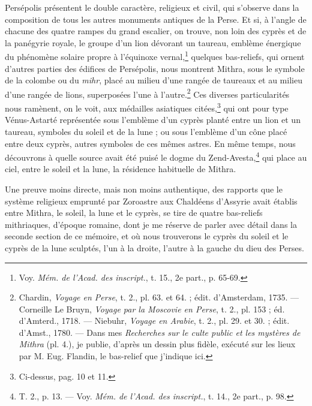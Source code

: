\documentclass[a4paper, 11pt, oneside, polutonikogreek, french]{article}
\begin{document}
Persépolis présentent le double caractère, religieux et civil, qui s'observe dans la composition de tous les autres monuments antiques de la Perse. Et si, à l'angle de chacune des quatre rampes du grand escalier, on trouve, non loin des cyprès et de la panégyrie royale, le groupe d'un lion dévorant un taureau, emblème énergique du phénomène solaire propre à l'équinoxe vernal,\footnote{Voy. \emph{Mém. de l'Acad. des inscript.}, t. 15., 2e part., p. 65-69.} quelques bas-reliefs, qui ornent d'autres parties des édifices de Persépolis, nous montrent Mithra, sous le symbole de la colombe ou du \emph{mihr}, placé au milieu d'une rangée de taureaux et au milieu d'une rangée de lions, superposées l'une à l'autre.\footnote{Chardin, \emph{Voyage en Perse}, t. 2., pl. 63. et 64. ; édit. d'Amsterdam, 1735. --- Corneille Le Bruyn, \emph{Voyage par la Moscovie en Perse}, t. 2., pl. 153 ; éd. d'Amterd., 1718. --- Niebuhr, \emph{Voyage en Arabie}, t. 2., pl. 29. et 30. ; édit. d'Amst., 1780. --- Dans mes \emph{Recherches sur le culte public et les mystères de Mithra} (pl. 4.), je publie, d'après un dessin plus fidèle, exécuté sur les lieux par M. Eug. Flandin, le bas-relief que j'indique ici.} Ces diverses particularités nous ramènent, on le voit, aux médailles asiatiques citées,\footnote{Ci-dessus, pag. 10 et 11.} qui ont pour type Vénus-Astarté représentée sous l'emblème d'un cyprès planté entre un lion et un taureau, symboles du soleil et de la lune ; ou sous l'emblème d'un cône placé entre deux cyprès, autres symboles de ces mêmes astres. En même temps, nous découvrons à quelle source avait été puisé le dogme du Zend-Avesta,\footnote{T. 2., p. 13. --- Voy. \emph{Mém. de l'Acad. des inscript.}, t. 14., 2e part., p. 98.} qui place au ciel, entre le soleil et la lune, la résidence habituelle de Mithra.

Une preuve moins directe, mais non moins authentique, des rapports que le système religieux emprunté par Zoroastre aux Chaldéens d'Assyrie avait établis entre Mithra, le soleil, la lune et le cyprès, se tire de quatre bas-reliefs mithriaques, d'époque romaine, dont je me réserve de parler avec détail dans la seconde section de ce mémoire, et où nous trouverons le cyprès du soleil et le cyprès de la lune sculptés, l'un à la droite, l'autre à la gauche du dieu des Perses.
\end{document}
